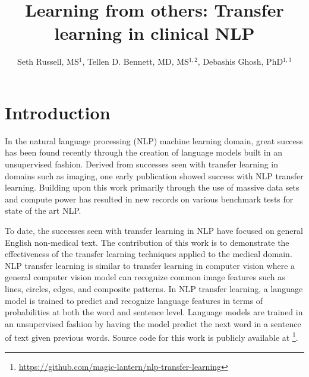 \documentclass{amia}
\begin{document}
\title{Learning from others: Transfer learning in clinical NLP}

\author{Seth Russell, MS$^{1}$,
    Tellen D. Bennett, MD, MS$^{1,2}$,
    Debashis Ghosh, PhD$^{1,3}$}


\maketitle



\section*{Introduction}

In the natural language processing (NLP) machine learning domain, great success has been found recently through the creation of language models built in an unsupervised fashion. Derived from successes seen with transfer learning in domains such as imaging, one early publication \cite{howard_universal_2018} showed success with NLP transfer learning. Building upon this work primarily through the use of massive data sets and compute power \cite{radford_language_2019} has resulted in new records on various benchmark tests for state of the art NLP.

To date, the successes seen with transfer learning in NLP have focused on general English non-medical text. The contribution of this work is to demonstrate the effectiveness of the transfer learning techniques applied to the medical domain. NLP transfer learning is similar to transfer learning in computer vision where a general computer vision model can recognize common image features such as lines, circles, edges, and composite patterns. In NLP transfer learning, a language model is trained to predict and recognize language features in terms of probabilities at both the word and sentence level. Language models are trained in an unsupervised fashion by having the model predict the next word in a sentence of text given previous words. Source code for this work is publicly available at \footnote{\url{https://github.com/magic-lantern/nlp-transfer-learning}}.
\end{document}
